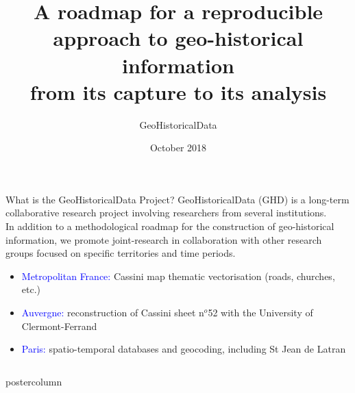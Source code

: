 \documentclass[final,hyperref={pdfpagelabels=false}]{beamer}
\title{A roadmap for a reproducible approach to geo-historical information\\from its capture to its analysis}
\author{GeoHistoricalData}
\institute{~}
\date{October 2018}
\let\oldcite=\cite
\renewcommand{\cite}[1]{\textcolor{ta3chameleon}{\oldcite{#1}}}
\begin{document}
\begin{frame}
  \begin{block}{What is the GeoHistoricalData Project?}
    \textcolor{ta3orange}{GeoHistoricalData} (GHD) is a long-term collaborative research project involving researchers from several institutions.\\%
    In addition to a methodological roadmap for the construction of geo-historical information, we promote joint-research in collaboration with other research groups focused on specific territories and time periods.%
    \begin{itemize}
    \item \textcolor{blue}{Metropolitan France:} \textcolor{ta3orange}{Cassini} map thematic vectorisation (roads, churches, etc.)
    \item \textcolor{blue}{Auvergne:} \textcolor{ta3orange}{reconstruction of Cassini sheet n$^{o}$52} with the University of Clermont-Ferrand
    \item \textcolor{blue}{Paris:} spatio-temporal databases and geocoding, including \textcolor{ta3orange}{St Jean de Latran}~\cite{Rebolledo-Dhuin2014}
    \end{itemize}
  \end{block}
  \begin{columns}
    \begin{column}{0.5\textwidth}
    \begin{beamercolorbox}[center,wd=\textwidth]{postercolumn}

\end{beamercolorbox}
\end{column}
\end{columns}
\end{frame}
\end{document}
